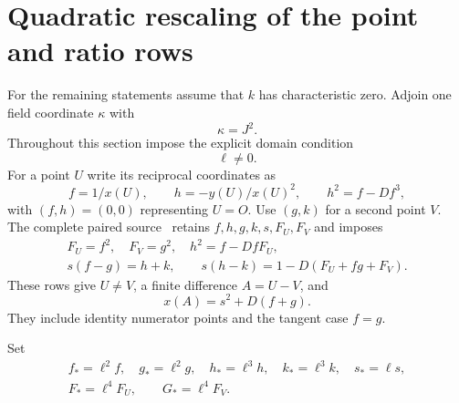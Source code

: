 \documentclass[11pt,a4paper]{article}
\theoremstyle{remark}\newtheorem{remark}[theorem]{Remark}
\begin{document}
\section{Quadratic rescaling of the point and ratio rows}
For the remaining statements assume that $k$ has characteristic zero.
Adjoin one field coordinate $\kappa$ with
\begin{equation}\label{eq:kappa}
                         \kappa=J^2.
\end{equation}
Throughout this section impose the explicit domain condition
\begin{equation}\label{eq:open}
                              \ell\ne0.
\end{equation}
For a point $U$ write its reciprocal coordinates as
\[
 f=1/x(U),\qquad h=-y(U)/x(U)^2,
 \qquad h^2=f-Df^3,
\]
with $(f,h)=(0,0)$ representing $U=O$. Use $(g,k)$ for a second
point $V$. The complete paired source~\cite{Trace} retains
$f,h,g,k,s,F_U,F_V$ and imposes
\begin{equation}\label{eq:unscaledpair}
 \begin{gathered}
 F_U=f^2,\quad F_V=g^2,\quad h^2=f-DfF_U,\\
 s(f-g)=h+k,\qquad
 s(h-k)=1-D(F_U+fg+F_V).
 \end{gathered}
\end{equation}
These rows give $U\ne V$, a finite difference $A=U-V$, and
\begin{equation}\label{eq:xA}
                         x(A)=s^2+D(f+g).
\end{equation}
They include identity numerator points and the tangent case $f=g$.

Set
\begin{equation}\label{eq:scalings}
 \begin{gathered}
 f_*=\ell^2f,\quad g_*=\ell^2g,\quad
 h_*=\ell^3h,\quad k_*=\ell^3k,\quad s_*=\ell s,\\
 F_*=\ell^4F_U,\qquad G_*=\ell^4F_V.
 \end{gathered}
\end{equation}
\end{document}
